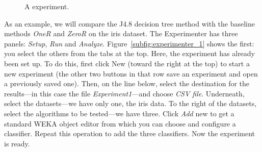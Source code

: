 \begin{figure}[!p]
\centering
{}
\newline
{}
\newline
{}
\caption{\label{fig:experimenter}A experiment.}
\end{figure}

As an example, we will compare the J4.8 decision tree method with the
baseline methods \textit{OneR} and \textit{ZeroR} on the iris
dataset. The Experimenter has three panels: \textit{Setup},
\textit{Run} and \textit{Analyze}. Figure~\ref{subfig:experimenter_1}
shows the first: you select the others from the tabs at the top. Here,
the experiment has already been set up. To do this, first click New
(toward the right at the top) to start a new experiment (the other two
buttons in that row save an experiment and open a previously saved
one). Then, on the line below, select the destination for the
results---in this case the file \textit{Experiment1}---and choose
\textit{CSV file}. Underneath, select the datasets---we have only one,
the iris data. To the right of the datasets, select the algorithms to
be tested---we have three. Click \textit{Add} new to get a standard
WEKA object editor from which you can choose and configure a
classifier. Repeat this operation to add the three classifiers. Now
the experiment is ready.

